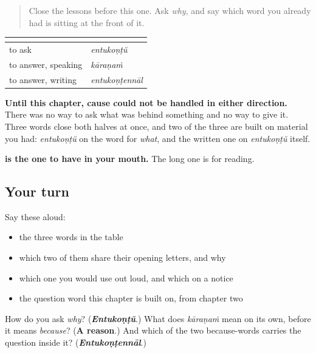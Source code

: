 \label{lesson:ML-R73-cause-recall}



\begin{quote}
Close the lessons before this one. Ask \emph{why}, and say which word you already had is sitting at the front of it.
\end{quote}

\begin{grammarlens}[title={Grammar Lens: a question and two answers}]
\noindent
\begin{tabularx}{\linewidth}{@{}>{\raggedright\arraybackslash}X>{\raggedright\arraybackslash}X@{}}
\toprule
\textbf{} & \textbf{} \\
\midrule
to ask & \textbf{\ml{എന്തുകൊണ്ട്}} \emph{entukoṇṭŭ} \\
to answer, speaking & \textbf{\ml{കാരണം}} \emph{kāraṇaṁ} \\
to answer, writing & \textbf{\ml{എന്തുകൊണ്ടെന്നാൽ}} \emph{entukoṇṭennāl} \\
\bottomrule
\end{tabularx}

\textbf{Until this chapter, cause could not be handled in either direction.} There was no way to ask what was behind something and no way to give it. Three words close both halves at once, and two of the three are built on material you had: \emph{entukoṇṭŭ} on the word for \emph{what}, and the written one on \emph{entukoṇṭŭ} itself.

\textbf{ is the one to have in your mouth.} The long one is for reading.
\end{grammarlens}

\subsection*{Your turn}
Say these aloud:

\begin{itemize}
\raggedright
  \item the three words in the table
  \item which two of them share their opening letters, and why
  \item which one you would use out loud, and which on a notice
  \item the question word this chapter is built on, from chapter two
\end{itemize}

\begin{tcolorbox}[breakable,colback=teal!4,colframe=teal!35!black,title={Before you move on}]
How do you ask \emph{why}? (\emph{\textbf{Entukoṇṭŭ}}.) What does \emph{kāraṇaṁ} mean on its own, before it means \emph{because}? (\textbf{A reason}.) And which of the two because-words carries the question inside it? (\emph{\textbf{Entukoṇṭennāl}}.)
\end{tcolorbox}
